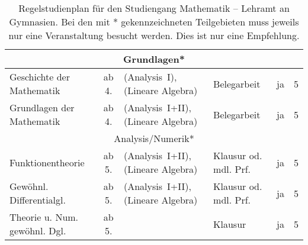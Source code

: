 \begin{table}[tbp]
\begin{small}
\begin{tabularx}{\textwidth}{|@{~}X@{~}|@{~}c@{~}|@{~}X@{~}|@{~}X@{~}|@{~}c@{~}|@{~}c@{~}|}
			\multicolumn{6}{|c|}{Grundlagen*}\\\hline
			Geschichte der Mathe\-matik&ab 4.&(Analysis~I), (Lineare Algebra)&Beleg\-arbeit&ja&5\\\hline
			Grund\-lagen der Mathe\-matik&ab 4.&(Analysis~I+II), (Lineare Algebra)&Beleg\-arbeit&ja&5\\\hline\hline
			\multicolumn{6}{|c|}{Analysis/Numerik*}\\\hline
			Funktionen\-theorie&ab 5.&(Analysis~I+II), (Lineare Algebra)&Klausur od. mdl. Prf.&ja&5\\\hline
			Gewöhnl. Differentialgl.&ab 5.&(Analysis~I+II), (Lineare Algebra)&Klausur od. mdl. Prf.&ja&5\\\hline
			Theorie u. Num. gewöhnl. Dgl.&ab 5.&&Klausur&ja&5\\\hline
		\end{tabularx}
	\end{small}
	\caption{\label{plan-lag}Regelstudienplan für den Studiengang
		Mathematik -- Lehramt an Gymnasien. Bei den mit * gekennzeichneten
		Teilgebieten muss jeweils nur eine Veranstaltung besucht werden. Dies
		ist nur eine Empfehlung.}
\end{table}

\label{studiengang_las}


